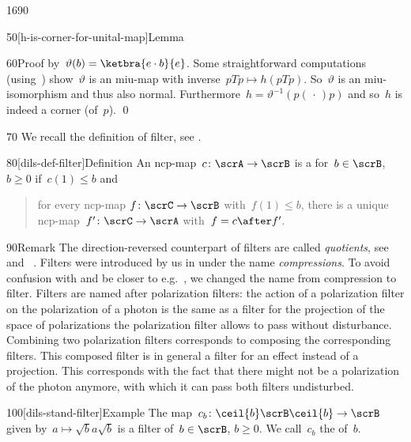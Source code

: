 \begin{parsec}{1690}
\begin{point}{50}[h-is-corner-for-unital-map]{Lemma}
\begin{point}{60}{Proof}
    by~$\vartheta(b) = \ketbra{e \cdot b}{e}$.
    Some straightforward computations (using~)
    show~$\vartheta$ is an miu-map
    with inverse~$pTp \mapsto h(pTp)$.
So~$\vartheta$ is an miu-isomorphism and thus also normal.
    Furthermore~$h = \vartheta^{-1}(p (\,\cdot\,) p)$
     and so~$h$ is indeed a corner (of~$p$). \qed
\end{point}
\end{point}
\begin{point}{70}%
We recall the definition of filter, see . 
\end{point}
\begin{point}{80}[dils-def-filter]{Definition}%
An ncp-map~$c \colon \scrA \to \scrB$
is a  for~$b \in\scrB$, $b \geq 0$ if~$c(1)\leq b$
    and
    \begin{quote}
        for every ncp-map $f\colon \scrC \to \scrB$
            with~$f(1) \leq b$,
            there is a unique ncp-map~$f'\colon \scrC \to \scrA$
            with~$f = c \after f'$.
    \end{quote}
\spacingfix{}
\begin{point}{90}{Remark}%
The direction-reversed counterpart
    of filters are called \emph{quotients},
    see~ and~\cite{effintro} .
Filters were introduced by us in \cite[dfn.~2]{westerbaan2016universal}
    under the name \emph{compressions}.
To avoid confusion with \cite{alfsen2012}
    and be closer to e.g.~\cite{wilce2016royal},
    we changed the name from compression to filter.
Filters are named after polarization filters:
    the action of a polarization filter on the polarization
        of a photon is the same as a filter for
        the projection of the space of polarizations
        the polarization filter allows to pass without disturbance.
Combining two polarization filters corresponds
    to composing the corresponding filters.
This composed filter is in general a filter for an effect instead
    of a projection.
This corresponds with the fact that there might not be a polarization
    of the photon anymore,
    with which it can pass both filters undisturbed.
\end{point}
\end{point}
\begin{point}{100}[dils-stand-filter]{Example}%
    The map~$c_b\colon \ceil{b} \scrB\ceil{b} \to \scrB $
        given by~$a \mapsto \sqrt{b} a \sqrt{b}$ is a filter
        of~$b\in \scrB$, $b\geq 0$.
        We call~$c_b$ the  of~$b$.

\end{point}
\end{parsec}
